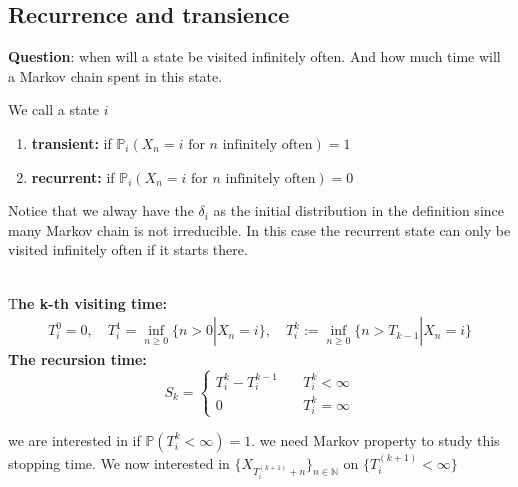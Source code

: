 \subsection{Recurrence and transience}
\textbf{Question}: when will a state be visited infinitely often. And how much time will a Markov chain spent in this state. 

\begin{definition}
	We call a state $i$
	\begin{enumerate}
		\item \textbf{transient:} if $\mathbb{P}_i(X_n = i \text{ for $n$ infinitely often}) = 1$
		\item \textbf{recurrent:} if $\mathbb{P}_i(X_n = i \text{ for $n$ infinitely often}) = 0$
	\end{enumerate}
\end{definition}
\begin{remark}
Notice that we alway have the $\delta_i$ as the initial distribution in the definition since many Markov chain is not irreducible. In this case the recurrent state can only be visited infinitely often if it starts there.	
\end{remark}

\quad\\
T\textbf{he k-th visiting time:} 
\begin{align*}
	T_i^0 = 0, \quad
	T_i^1 = \inf_{n \geq 0} \{ n > 0 | X_n = i\}, \quad
	T^{k}_i:= \inf_{n \ge 0} \{n > T_{k-1}| X_n = i \} 
\end{align*}
\textbf{The recursion time:}
\begin{equation*}
	S_k = \left\{
	\begin{aligned}
		T^k_i - T^{k-1}_i\quad &T^k_i < \infty \\
		0 \quad & T^k_i = \infty
	\end{aligned}
	\right.
\end{equation*}

we are interested in if $\mathbb{P}(T_i^k < \infty) = 1$. we need Markov property to study this stopping time. We now interested in $\{X_{T_i^{(k+1)}+ n}\}_{n \in \mathbb{N}}$ on $\{ T_i^{(k+1)} < \infty \}$


